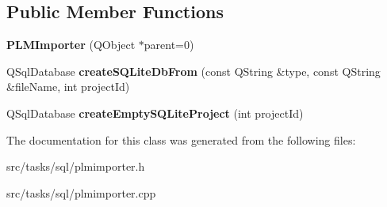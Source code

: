\subsection*{Public Member Functions}
\begin{DoxyCompactItemize}
\item 
{\bfseries P\+L\+M\+Importer} (Q\+Object $\ast$parent=0)\hypertarget{class_p_l_m_importer_abe28800196747217ddeb78cc463de130}{}\label{class_p_l_m_importer_abe28800196747217ddeb78cc463de130}

\item 
Q\+Sql\+Database {\bfseries create\+S\+Q\+Lite\+Db\+From} (const Q\+String \&type, const Q\+String \&file\+Name, int project\+Id)\hypertarget{class_p_l_m_importer_aaaefaf1e4e123361b47e815381694727}{}\label{class_p_l_m_importer_aaaefaf1e4e123361b47e815381694727}

\item 
Q\+Sql\+Database {\bfseries create\+Empty\+S\+Q\+Lite\+Project} (int project\+Id)\hypertarget{class_p_l_m_importer_a884a8b0e0341243cb02654d08d99f4d0}{}\label{class_p_l_m_importer_a884a8b0e0341243cb02654d08d99f4d0}

\end{DoxyCompactItemize}


The documentation for this class was generated from the following files\+:\begin{DoxyCompactItemize}
\item 
src/tasks/sql/plmimporter.\+h\item 
src/tasks/sql/plmimporter.\+cpp\end{DoxyCompactItemize}

